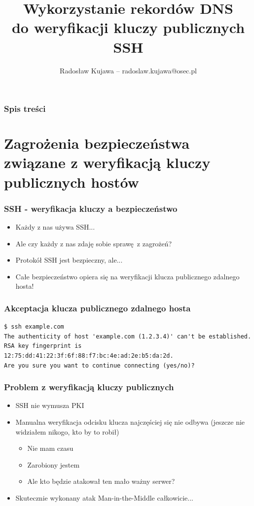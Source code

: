 \documentclass[dvipsnames,table]{beamer}
\title{Wykorzystanie rekordów DNS \\ do weryfikacji kluczy publicznych SSH}
\author{Radosław Kujawa -- radoslaw.kujawa@osec.pl}
\institute{OSEC}
\begin{document}
\begin{frame}
\titlepage
\end{frame}

\begin{frame}[allowframebreaks]
\frametitle{Spis treści}
{
\hypersetup{colorlinks=true,linkcolor=black,urlcolor=OSEC-red}
\tableofcontents
}
\end{frame}

\section{Zagrożenia bezpieczeństwa związane z weryfikacją kluczy publicznych hostów}

\begin{frame}
\frametitle{SSH - weryfikacja kluczy a bezpieczeństwo}
\begin{itemize}
	\item Każdy z nas używa SSH...
	\item Ale czy każdy z nas zdaję sobie sprawę z zagrożeń? 
	\item Protokół SSH jest bezpieczny, ale...
	\item Całe bezpieczeństwo opiera się na weryfikacji klucza publicznego zdalnego hosta!
\end{itemize}
\end{frame}

\begin{frame}[fragile]
\frametitle{Akceptacja klucza publicznego zdalnego hosta}
\scriptsize
\begin{verbatim}
$ ssh example.com
The authenticity of host 'example.com (1.2.3.4)' can't be established.
RSA key fingerprint is 12:75:dd:41:22:3f:6f:88:f7:bc:4e:ad:2e:b5:da:2d.
Are you sure you want to continue connecting (yes/no)?
\end{verbatim}
\end{frame}

\begin{frame}
\frametitle{Problem z weryfikacją kluczy publicznych}
\begin{itemize}
	\item SSH nie wymusza PKI
	\item Manualna weryfikacja odcisku klucza najczęściej się nie odbywa (jeszcze nie widziałem nikogo, kto by to robił)
	\begin{itemize}
		\item Nie mam czasu
		\item Zarobiony jestem
		\item Ale kto będzie atakował ten mało ważny serwer?
	\end{itemize}
	\item Skutecznie wykonany atak Man-in-the-Middle całkowicie...
\end{itemize}
\end{frame}
\end{document}
